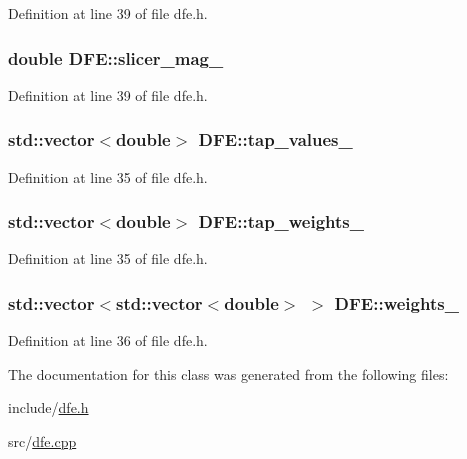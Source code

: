 Definition at line 39 of file dfe.\+h.

\hypertarget{class_d_f_e_a6cf2fe347ce67ef6522c916cbba0ecb5}{}
\subsubsection[{slicer\+\_\+mag\+\_\+}]{\setlength{\rightskip}{0pt plus 5cm}double D\+F\+E\+::slicer\+\_\+mag\+\_\+\hspace{0.3cm}{\ttfamily [protected]}}\label{class_d_f_e_a6cf2fe347ce67ef6522c916cbba0ecb5}


Definition at line 39 of file dfe.\+h.

\hypertarget{class_d_f_e_a863c529627c7b2b73fcff8bf1db03982}{}
\subsubsection[{tap\+\_\+values\+\_\+}]{\setlength{\rightskip}{0pt plus 5cm}std\+::vector$<$double$>$ D\+F\+E\+::tap\+\_\+values\+\_\+\hspace{0.3cm}{\ttfamily [protected]}}\label{class_d_f_e_a863c529627c7b2b73fcff8bf1db03982}


Definition at line 35 of file dfe.\+h.

\hypertarget{class_d_f_e_ae05f0b024c5cc05b0fb58c70c36e249a}{}
\subsubsection[{tap\+\_\+weights\+\_\+}]{\setlength{\rightskip}{0pt plus 5cm}std\+::vector$<$double$>$ D\+F\+E\+::tap\+\_\+weights\+\_\+\hspace{0.3cm}{\ttfamily [protected]}}\label{class_d_f_e_ae05f0b024c5cc05b0fb58c70c36e249a}


Definition at line 35 of file dfe.\+h.

\hypertarget{class_d_f_e_af23a84b8ec9cf7d1c8d445b8a0427f32}{}
\subsubsection[{weights\+\_\+}]{\setlength{\rightskip}{0pt plus 5cm}std\+::vector$<$std\+::vector$<$double$>$ $>$ D\+F\+E\+::weights\+\_\+\hspace{0.3cm}{\ttfamily [protected]}}\label{class_d_f_e_af23a84b8ec9cf7d1c8d445b8a0427f32}


Definition at line 36 of file dfe.\+h.



The documentation for this class was generated from the following files\+:\begin{DoxyCompactItemize}
\item 
include/\hyperlink{dfe_8h}{dfe.\+h}\item 
src/\hyperlink{dfe_8cpp}{dfe.\+cpp}\end{DoxyCompactItemize}
